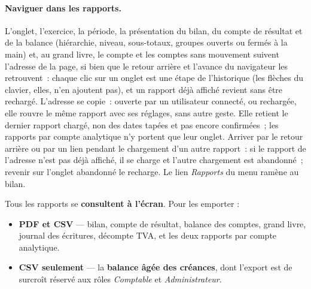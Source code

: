 \documentclass[a4paper,11pt,oneside]{article}
\begin{document}
\paragraph{Naviguer dans les rapports.} L'onglet, l'exercice, la période, la présentation du bilan, du compte de
résultat et de la balance (hiérarchie, niveau, sous-totaux, groupes ouverts ou fermés à la main) et, au grand
livre, le compte et les comptes sans mouvement suivent l'adresse de la page, si bien que le retour arrière et l'avance du navigateur les
retrouvent~: chaque clic sur un onglet est une étape de l'historique (les flèches du clavier, elles, n'en ajoutent
pas), et un rapport déjà affiché revient sans être rechargé. L'adresse se copie~: ouverte par un utilisateur
connecté, ou rechargée, elle rouvre le même rapport avec ses réglages, sans autre geste. Elle retient le dernier
rapport chargé, non des dates tapées et pas encore confirmées~; les rapports par compte analytique n'y portent
que leur onglet. Arriver par le retour arrière ou par un lien pendant le chargement d'un autre rapport~: si le
rapport de l'adresse n'est pas déjà affiché, il se charge et l'autre chargement est abandonné~; revenir sur
l'onglet abandonné le recharge. Le lien \emph{Rapports}
du menu ramène au bilan.

Tous les rapports se \textbf{consultent à l'écran}. Pour les emporter :

\begin{itemize}
    \item \textbf{PDF et CSV} — bilan, compte de résultat, balance des comptes, grand livre,
          journal des écritures, décompte TVA, et les deux rapports par compte analytique.
    \item \textbf{CSV seulement} — la \textbf{balance âgée des créances}, dont l'export est de
          surcroît réservé aux rôles \emph{Comptable} et \emph{Administrateur}.
\end{itemize}
\end{document}
